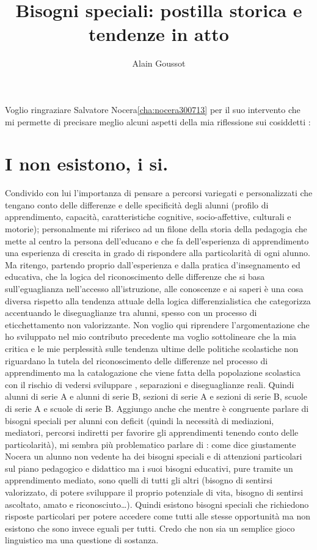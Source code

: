 \author{Alain Goussot}
\title{Bisogni speciali: postilla storica e tendenze in atto}
\label{cha:Goussot010813}
\maketitle
Voglio ringraziare Salvatore Nocera\ref*{cha:nocera300713} per il suo intervento che mi permette di precisare meglio alcuni aspetti della mia riflessione sui cosiddetti :

\section*{I  non esistono, i  si.}

Condivido con lui l'importanza di pensare a percorsi variegati e personalizzati che tengano conto delle differenze e delle specificità degli alunni (profilo di apprendimento, capacità, caratteristiche cognitive, socio-affettive, culturali e motorie); personalmente mi riferisco ad un filone della storia della pedagogia che mette al centro la persona dell'educano e che fa dell'esperienza di apprendimento una esperienza di crescita in grado di rispondere alla particolarità di ogni alunno. Ma ritengo, partendo proprio dall'esperienza e dalla pratica d'insegnamento ed educativa, che la logica del riconoscimento delle differenze che si basa sull'eguaglianza nell'accesso all'istruzione, alle conoscenze e ai saperi è una cosa diversa rispetto alla tendenza attuale della logica differenzialistica che categorizza accentuando le diseguaglianze tra alunni, spesso con un processo di eticchettamento non valorizzante. Non voglio qui riprendere l'argomentazione che ho sviluppato nel mio contributo precedente ma voglio sottolineare che la mia critica e le mie perplessità sulle tendenza ultime delle politiche scolastiche non riguardano la tutela del riconoscimento delle differenze nel processo di apprendimento ma la catalogazione che viene fatta della popolazione scolastica con il rischio di vedersi sviluppare , separazioni e diseguaglianze reali. Quindi alunni di serie A e alunni di serie B, sezioni di serie A e sezioni di serie B, scuole di serie A e scuole di serie B. Aggiungo anche che mentre è congruente parlare di bisogni speciali per alunni con deficit (quindi la necessità di mediazioni, mediatori, percorsi indiretti per favorire gli apprendimenti tenendo conto delle particolarità), mi sembra più problematico parlare di : come dice giustamente Nocera un alunno non vedente ha dei bisogni speciali e di attenzioni particolari sul piano pedagogico e didattico ma i suoi bisogni educativi, pure tramite un apprendimento mediato, sono quelli di tutti gli altri (bisogno di sentirsi valorizzato, di potere sviluppare il proprio potenziale di vita, bisogno di sentirsi ascoltato, amato e riconosciuto\dots). Quindi esistono bisogni speciali che richiedono risposte particolari per potere accedere come tutti alle stesse opportunità ma non esistono  che sono invece eguali per tutti. Credo che non sia un semplice gioco linguistico ma una questione di sostanza.

